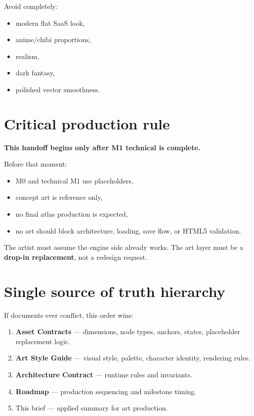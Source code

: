 \documentclass[11pt,a4paper]{article}
\newcommand{\briefbox}[2]{%
  \begin{tcolorbox}[
    colback=RCSoftBg,
    colframe=RCLightBorder,
    boxrule=0.5pt,
    arc=1mm,
    left=4mm,right=4mm,top=2.5mm,bottom=2.5mm,
    title=\textbf{#1},
    coltitle=black,
    fonttitle=\bfseries
  ]
  #2
  \end{tcolorbox}
}
\begin{document}
Avoid completely:
\begin{itemize}
  \item modern flat SaaS look,
  \item anime/chibi proportions,
  \item realism,
  \item dark fantasy,
  \item polished vector smoothness.
\end{itemize}

\section{Critical production rule}

\briefbox{Non-negotiable rule}{
\textbf{This handoff begins only after M1 technical is complete.}

Before that moment:
\begin{itemize}
  \item M0 and technical M1 use placeholders,
  \item concept art is reference only,
  \item no final atlas production is expected,
  \item no art should block architecture, loading, save flow, or HTML5 validation.
\end{itemize}

The artist must assume the engine side already works. The art layer must be a \textbf{drop-in replacement}, not a redesign request.
}

\section{Single source of truth hierarchy}

If documents ever conflict, this order wins:
\begin{enumerate}
  \item \textbf{Asset Contracts} — dimensions, node types, anchors, states, placeholder replacement logic.
  \item \textbf{Art Style Guide} — visual style, palette, character identity, rendering rules.
  \item \textbf{Architecture Contract} — runtime rules and invariants.
  \item \textbf{Roadmap} — production sequencing and milestone timing.
  \item This brief — applied summary for art production.
\end{enumerate}
\end{document}
